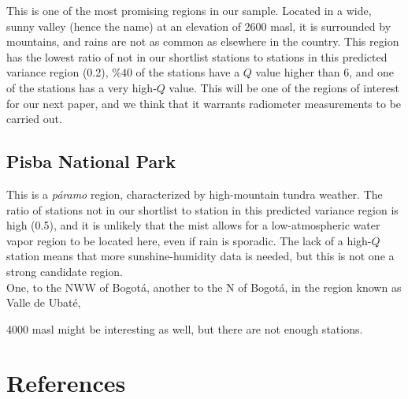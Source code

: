 \documentclass[12pt]{iopart}
\begin{document}
This is one of the most promising regions in our sample. Located in a wide, sunny valley (hence the name) at an elevation of 2600 masl, it is surrounded by mountains, and rains are not as common as elsewhere in the country. This region has the lowest ratio of not in our shortlist stations to stations in this predicted variance region (0.2), $\%40$ of the stations have a $Q$ value higher than 6, and one of the stations has a very high-$Q$ value. This will be one of the regions of interest for our next paper, and we think that it warrants radiometer measurements to be carried out.

\subsection{Pisba National Park}

This is a \emph{p\'aramo} region, characterized by high-mountain tundra weather. The ratio of stations not in our shortlist to station in this predicted variance region is high (0.5), and it is unlikely that the mist allows for a low-atmospheric water vapor region to be located here, even if rain is sporadic. The lack of a high-$Q$ station means that more sunshine-humidity data is needed, but this is not one a strong candidate region.\\



One, to the NWW of Bogot\'a, another to the N of Bogot\'a, in the region known as Valle de Ubat\'e, 

4000 masl might be interesting as well, but there are not enough stations.

 
 


  

 \section*{References}
 

  
  
\end{document}
